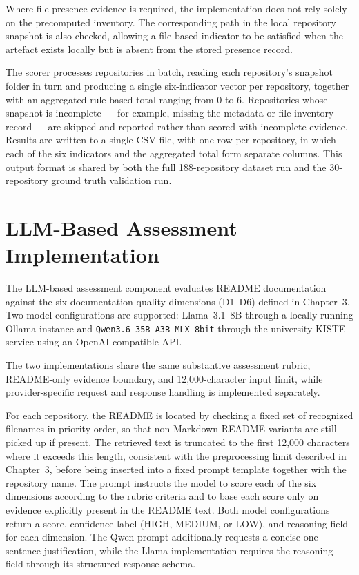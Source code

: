 Where file-presence evidence is required, the implementation does
not rely solely on the precomputed inventory. The corresponding path
in the local repository snapshot is also checked, allowing a
file-based indicator to be satisfied when the artefact exists locally
but is absent from the stored presence record.

The scorer processes repositories in batch, reading each
repository's snapshot folder in turn and producing a single
six-indicator vector per repository, together with an aggregated
rule-based total ranging from 0 to 6. Repositories whose snapshot is
incomplete --- for example, missing the metadata or file-inventory
record --- are skipped and reported rather than scored with
incomplete evidence. Results are written to a single CSV file, with
one row per repository, in which each of the six indicators and the
aggregated total form separate columns. This output format is shared
by both the full 188-repository dataset run and the 30-repository
ground truth validation run.


\section{LLM-Based Assessment Implementation}
The LLM-based assessment component evaluates README documentation
against the six documentation quality dimensions (D1--D6) defined in
Chapter~3. Two model configurations are supported: Llama~3.1~8B
through a locally running Ollama instance and
\texttt{Qwen3.6-35B-A3B-MLX-8bit} through the university KISTE
service using an OpenAI-compatible API.

The two implementations share the same substantive assessment rubric,
README-only evidence boundary, and 12,000-character input limit, while
provider-specific request and response handling is implemented
separately.

For each repository, the README is located by checking a fixed set
of recognized filenames in priority order, so that non-Markdown
README variants are still picked up if present. The retrieved text
is truncated to the first 12{,}000 characters where it exceeds this
length, consistent with the preprocessing limit described in
Chapter~3, before being inserted into a fixed prompt template
together with the repository name. The prompt instructs the model to score each of the six dimensions
according to the rubric criteria and to base each score only on evidence
explicitly present in the README text. Both model configurations return
a score, confidence label (HIGH, MEDIUM, or LOW), and reasoning field
for each dimension. The Qwen prompt additionally requests a concise
one-sentence justification, while the Llama implementation requires the
reasoning field through its structured response schema.

